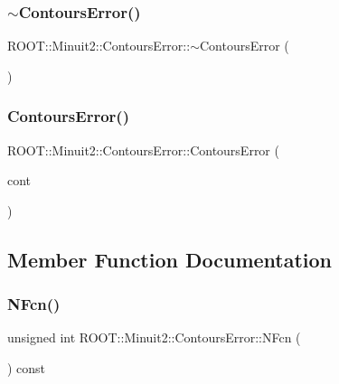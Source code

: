 \subsubsection{\texorpdfstring{$\sim$ContoursError()}{~ContoursError()}\hspace{0.1cm}{\footnotesize\ttfamily [2/2]}}
{\footnotesize\ttfamily R\+O\+O\+T\+::\+Minuit2\+::\+Contours\+Error\+::$\sim$\+Contours\+Error (\begin{DoxyParamCaption}{ }\end{DoxyParamCaption})\hspace{0.3cm}{\ttfamily [inline]}}

\mbox{\label{classROOT_1_1Minuit2_1_1ContoursError_a270e1882e03ca939a8a910f9c6f3cbeb}} 
\subsubsection{\texorpdfstring{ContoursError()}{ContoursError()}\hspace{0.1cm}{\footnotesize\ttfamily [4/4]}}
{\footnotesize\ttfamily R\+O\+O\+T\+::\+Minuit2\+::\+Contours\+Error\+::\+Contours\+Error (\begin{DoxyParamCaption}\item[{const \mbox{\hyperlink{classROOT_1_1Minuit2_1_1ContoursError}{Contours\+Error}} \&}]{cont }\end{DoxyParamCaption})\hspace{0.3cm}{\ttfamily [inline]}}



\subsection{Member Function Documentation}
\mbox{\label{classROOT_1_1Minuit2_1_1ContoursError_a1342abcb15690e6897ad860e7f05026d}} 
\subsubsection{\texorpdfstring{NFcn()}{NFcn()}\hspace{0.1cm}{\footnotesize\ttfamily [1/2]}}
{\footnotesize\ttfamily unsigned int R\+O\+O\+T\+::\+Minuit2\+::\+Contours\+Error\+::\+N\+Fcn (\begin{DoxyParamCaption}{ }\end{DoxyParamCaption}) const\hspace{0.3cm}{\ttfamily [inline]}}

